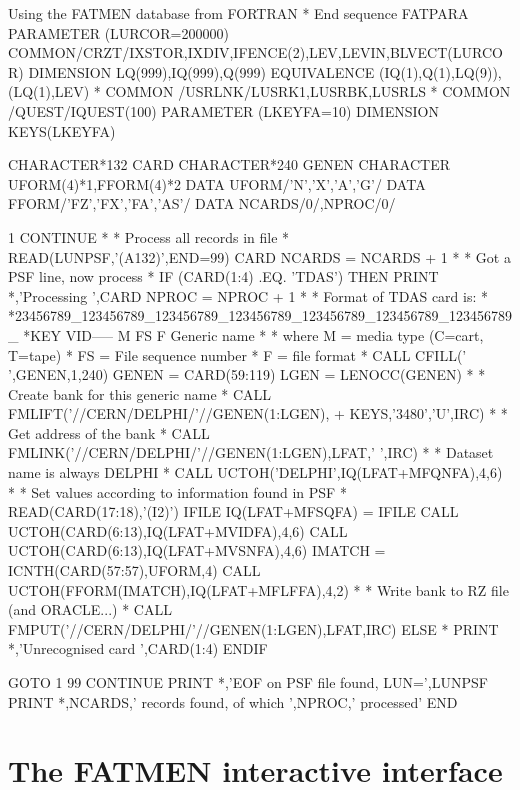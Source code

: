 \begin{XMPt}{Using the FATMEN database from FORTRAN}
* End   sequence FATPARA
      PARAMETER (LURCOR=200000)
      COMMON/CRZT/IXSTOR,IXDIV,IFENCE(2),LEV,LEVIN,BLVECT(LURCOR)
      DIMENSION    LQ(999),IQ(999),Q(999)
      EQUIVALENCE (IQ(1),Q(1),LQ(9)),(LQ(1),LEV)
*
      COMMON /USRLNK/LUSRK1,LUSRBK,LUSRLS
*
      COMMON /QUEST/IQUEST(100)
      PARAMETER (LKEYFA=10)
      DIMENSION KEYS(LKEYFA)
 
      CHARACTER*132 CARD
      CHARACTER*240 GENEN
      CHARACTER     UFORM(4)*1,FFORM(4)*2
      DATA          UFORM/'N','X','A','G'/
      DATA          FFORM/'FZ','FX','FA','AS'/
      DATA NCARDS/0/,NPROC/0/
 
 1    CONTINUE
*
*     Process all records in file
*
      READ(LUNPSF,'(A132)',END=99) CARD
      NCARDS = NCARDS + 1
*
*     Got a PSF line, now process
*
      IF (CARD(1:4) .EQ. 'TDAS') THEN
         PRINT *,'Processing ',CARD
         NPROC = NPROC + 1
*
*     Format of TDAS card is:
*
*23456789_123456789_123456789_123456789_123456789_123456789_123456789_
*KEY VID----- M FS                                      F Generic name
*
*     where M  = media type (C=cart, T=tape)
*           FS = File sequence number
*           F  = file format
*
         CALL CFILL(' ',GENEN,1,240)
         GENEN = CARD(59:119)
         LGEN = LENOCC(GENEN)
*
*     Create bank for this generic name
*
         CALL FMLIFT('//CERN/DELPHI/'//GENEN(1:LGEN),
     +   KEYS,'3480','U',IRC)
*
*     Get address of the bank
*
         CALL FMLINK('//CERN/DELPHI/'//GENEN(1:LGEN),LFAT,' ',IRC)
*
*     Dataset name is always DELPHI
*
         CALL UCTOH('DELPHI',IQ(LFAT+MFQNFA),4,6)
*
*     Set values according to information found in PSF
*
         READ(CARD(17:18),'(I2)') IFILE
         IQ(LFAT+MFSQFA) = IFILE
         CALL UCTOH(CARD(6:13),IQ(LFAT+MVIDFA),4,6)
         CALL UCTOH(CARD(6:13),IQ(LFAT+MVSNFA),4,6)
         IMATCH = ICNTH(CARD(57:57),UFORM,4)
         CALL UCTOH(FFORM(IMATCH),IQ(LFAT+MFLFFA),4,2)
*
*     Write bank to RZ file (and ORACLE...)
*
         CALL FMPUT('//CERN/DELPHI/'//GENEN(1:LGEN),LFAT,IRC)
         ELSE
*        PRINT *,'Unrecognised card ',CARD(1:4)
         ENDIF
 
      GOTO 1
99    CONTINUE
      PRINT *,'EOF on PSF file found, LUN=',LUNPSF
      PRINT *,NCARDS,' records found, of which ',NPROC,' processed'
      END
\end{XMPt}

\chapter{The FATMEN interactive interface}
